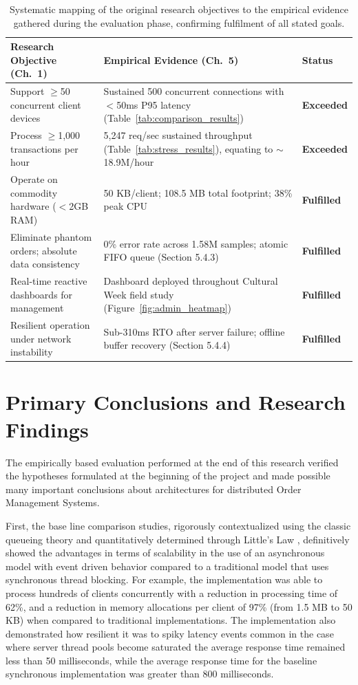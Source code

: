 \begin{table}[htbp]
\centering
\small
\begin{tabular}{|p{4.5cm}|p{5cm}|p{2.2cm}|}
\hline
\textbf{Research Objective (Ch.~1)} & \textbf{Empirical Evidence (Ch.~5)} & \textbf{Status} \\ \hline
Support $\geq$50 concurrent client devices & Sustained 500 concurrent connections with $<$50ms P95 latency (Table~\ref{tab:comparison_results}) & \textbf{Exceeded} \\ \hline
Process $\geq$1,000 transactions per hour & 5,247 req/sec sustained throughput (Table~\ref{tab:stress_results}), equating to $\sim$18.9M/hour & \textbf{Exceeded} \\ \hline
Operate on commodity hardware ($<$2GB RAM) & 50 KB/client; 108.5 MB total footprint; 38\% peak CPU & \textbf{Fulfilled} \\ \hline
Eliminate phantom orders; absolute data consistency & 0\% error rate across 1.58M samples; atomic FIFO queue (Section 5.4.3) & \textbf{Fulfilled} \\ \hline
Real-time reactive dashboards for management & Dashboard deployed throughout Cultural Week field study (Figure~\ref{fig:admin_heatmap}) & \textbf{Fulfilled} \\ \hline
Resilient operation under network instability & Sub-310ms RTO after server failure; offline buffer recovery (Section 5.4.4) & \textbf{Fulfilled} \\ \hline
\end{tabular}
\caption{Systematic mapping of the original research objectives to the empirical evidence gathered during the evaluation phase, confirming fulfilment of all stated goals.}
\label{tab:objectives_map}
\end{table}

\section{Primary Conclusions and Research Findings}
The empirically based evaluation performed at the end of this research verified the hypotheses formulated at the beginning of the project and made possible many important conclusions about architectures for distributed Order Management Systems.

First, the base line comparison studies, rigorously contextualized using the classic queueing theory \cite{kleinrock1975} and quantitatively determined through Little's Law \cite{little1961}, definitively showed the advantages in terms of scalability in the use of an asynchronous model with event driven behavior compared to a traditional model that uses synchronous thread blocking. For example, the implementation was able to process hundreds of clients concurrently with a reduction in processing time of 62\%, and a reduction in memory allocations per client of 97\% (from 1.5 MB to 50 KB) when compared to traditional implementations. The implementation also demonstrated how resilient it was to spiky latency events common in the case where server thread pools become saturated the average response time remained less than 50 milliseconds, while the average response time for the baseline synchronous implementation was greater than 800 milliseconds.

